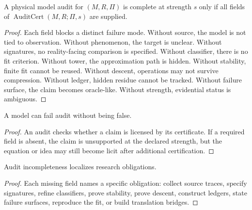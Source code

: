 \begin{theorem}
\label{thm:complete-audit-requires-all-fields}
A physical model audit for $(M,R,\Pi)$ is complete at strength $s$ only if all fields of $\operatorname{AuditCert}(M,R;\Pi,s)$ are supplied.
\end{theorem}

\begin{proof}
Each field blocks a distinct failure mode. Without source, the model is not tied to observation. Without phenomenon, the target is unclear. Without signatures, no reality-facing comparison is specified. Without classifier, there is no fit criterion. Without tower, the approximation path is hidden. Without stability, finite fit cannot be reused. Without descent, operations may not survive compression. Without ledger, hidden residue cannot be tracked. Without failure surface, the claim becomes oracle-like. Without strength, evidential status is ambiguous.
\end{proof}

\begin{corollary}
\label{cor:audit-failure-undercertification}
A model can fail audit without being false.
\end{corollary}

\begin{proof}
An audit checks whether a claim is licensed by its certificate. If a required field is absent, the claim is unsupported at the declared strength, but the equation or idea may still become licit after additional certification.
\end{proof}

\begin{corollary}
\label{cor:missing-fields-localize-research}
Audit incompleteness localizes research obligations.
\end{corollary}

\begin{proof}
Each missing field names a specific obligation: collect source traces, specify signatures, refine classifiers, prove stability, prove descent, construct ledgers, state failure surfaces, reproduce the fit, or build translation bridges.
\end{proof}

